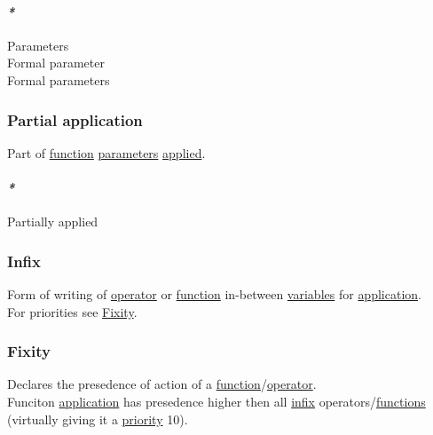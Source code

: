 \documentclass[11pt]{article}
\begin{document}
\paragraph{\emph{*}}
\label{sec:orgd07cfe3}

\label{orgcafb058}Parameters\\
\label{org821c357}Formal parameter\\
\label{orgc549e28}Formal parameters\\

\subsubsection{\label{orgad54a48}Partial application}
\label{sec:org34e7be3}
Part of \hyperref[orge15bc14]{function} \hyperref[orgcafb058]{parameters} \hyperref[org7abd585]{applied}.\\

\paragraph{\emph{*}}
\label{sec:org7d8c7ce}

\label{org23a90a6}Partially applied\\

\subsubsection{\label{org3c7984a}Infix}
\label{sec:org75e1e1e}
Form of writing of \hyperref[org28ae05d]{operator} or \hyperref[orge15bc14]{function} in-between \hyperref[orge17f54f]{variables} for \hyperref[org2b89e66]{application}.\\

For priorities see \hyperref[org561ae24]{Fixity}.\\

\subsubsection{\label{org561ae24}Fixity}
\label{sec:orgeaaf062}
Declares the presedence of action of a \hyperref[orge15bc14]{function}/\hyperref[org28ae05d]{operator}.\\

Funciton \hyperref[org2b89e66]{application} has presedence higher then all \hyperref[org3c7984a]{infix} operators/\hyperref[orgaa8fb87]{functions} (virtually giving it a \hyperref[org8cf8667]{priority} 10).\\
\end{document}
